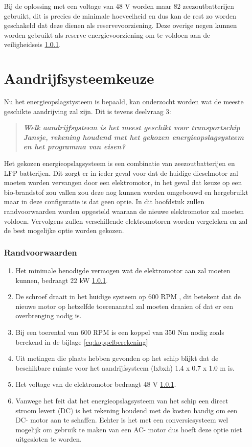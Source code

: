 Bij de oplossing met een voltage van 48 V worden maar 82 zeezoutbatterijen gebruikt, dit is precies de minimale hoeveelheid en dus kan de rest zo worden geschakeld dat deze dienen als reservevoorziening.
Deze overige negen kunnen worden gebruikt als reserve energievoorziening om te voldoen aan de veiligheidseis \ref{}. 







\chapter{Aandrijfsysteemkeuze}

\noindent Nu het energieopslagstysteem is bepaald, kan onderzocht worden wat de meeste geschikte aandrijving zal zijn. Dit is tevens deelvraag 3:
\begin{quote}
    \textit{\textbf{Welk aandrijfsysteem is het meest geschikt voor transportschip Jansje, rekening houdend met
het gekozen energieopslagsysteem en het programma van eisen?}}
\end{quote}
\noindent Het gekozen energieopslagsysteem is een combinatie van zeezoutbatterijen en LFP batterijen. Dit zorgt er in ieder geval voor dat de huidige dieselmotor zal moeten worden vervangen door een elektromotor, in het geval dat keuze op een bio-brandstof zou vallen zou deze nog kunnen worden omgebouwd en hergebruikt maar in deze configuratie is dat geen optie. In dit hoofdstuk zullen randvoorwaarden worden opgesteld waaraan de nieuwe elektromotor zal moeten voldoen. Vervolgens zullen verschillende elektromotoren worden vergeleken en zal de best mogelijke optie worden gekozen.

\subsection{Randvoorwaarden}
\begin{enumerate}
    \item Het minimale benodigde vermogen wat de elektromotor aan zal moeten kunnen, bedraagt 22 kW \ref{}.
    \item De schroef draait in het huidige systeem op 600 RPM \cite{mail arnold}, dit betekent dat de nieuwe motor op hetzelfde toerenaantal zal moeten draaien of dat er een overbrenging nodig is. 
    \item Bij een toerental van 600 RPM is een koppel van 350 Nm nodig zoals berekend in de bijlage \ref{eq:koppelberekening}
    \item Uit metingen die plaats hebben gevonden op het schip blijkt dat de beschikbare ruimte voor het aandrijfsysteem (lxbxh) 1.4 x 0.7 x 1.0 m is.     
    \item Het voltage van de elektromotor bedraagt 48 V \ref{}.
    \item Vanwege het feit dat het energieopslagsysteem van het schip een direct stroom levert (DC) \cite{} is het rekening houdend met de kosten handig om een DC- motor aan te schaffen. Echter is het met een conversiesysteem wel mogelijk om gebruik te maken van een AC- motor dus hoeft deze optie niet uitgesloten te worden. 
\end{enumerate}



